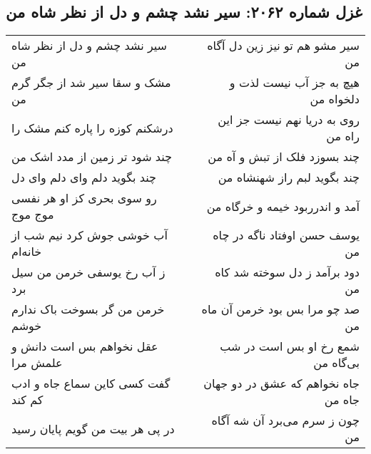 \begin{center}
\section*{غزل شماره ۲۰۶۲: سیر نشد چشم و دل از نظر شاه من}
\label{sec:2062}
\begin{longtable}{l p{0.5cm} r}
سیر نشد چشم و دل از نظر شاه من
&&
سیر مشو هم تو نیز زین دل آگاه من
\\
مشک و سقا سیر شد از جگر گرم من
&&
هیچ به جز آب نیست لذت و دلخواه من
\\
درشکنم کوزه را پاره کنم مشک را
&&
روی به دریا نهم نیست جز این راه من
\\
چند شود تر زمین از مدد اشک من
&&
چند بسوزد فلک از تبش و آه من
\\
چند بگوید دلم وای دلم وای دل
&&
چند بگوید لبم راز شهنشاه من
\\
رو سوی بحری کز او هر نفسی موج موج
&&
آمد و اندرربود خیمه و خرگاه من
\\
آب خوشی جوش کرد نیم شب از خانه‌ام
&&
یوسف حسن اوفتاد ناگه در چاه من
\\
ز آب رخ یوسفی خرمن من سیل برد
&&
دود برآمد ز دل سوخته شد کاه من
\\
خرمن من گر بسوخت باک ندارم خوشم
&&
صد چو مرا بس بود خرمن آن ماه من
\\
عقل نخواهم بس است دانش و علمش مرا
&&
شمع رخ او بس است در شب بی‌گاه من
\\
گفت کسی کاین سماع جاه و ادب کم کند
&&
جاه نخواهم که عشق در دو جهان جاه من
\\
در پی هر بیت من گویم پایان رسید
&&
چون ز سرم می‌برد آن شه آگاه من
\\
\end{longtable}
\end{center}
